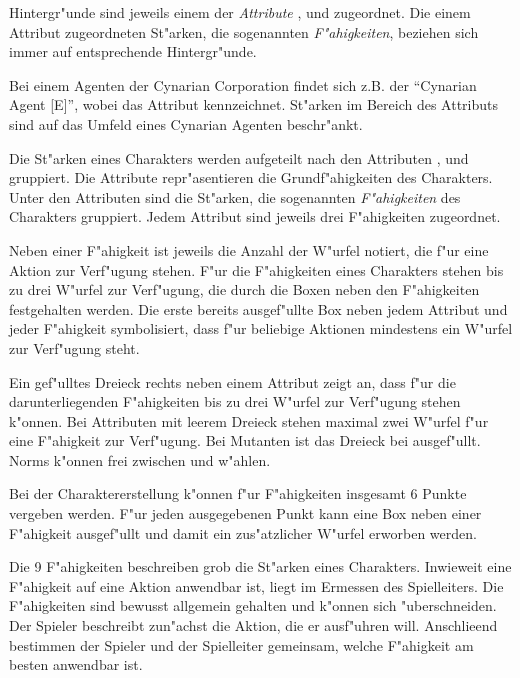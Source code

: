 \medskip
Hintergr"unde sind jeweils einem der \emph{Attribute} ,  und  zugeordnet. Die einem Attribut zugeordneten St"arken, die sogenannten \emph{F"ahigkeiten}, beziehen sich immer auf entsprechende Hintergr"unde.


\medskip
\begin{ruleexample}
    Bei einem Agenten der Cynarian Corporation findet sich z.B. der  "`Cynarian Agent [E]"', wobei \stat{[E]} das Attribut  kennzeichnet. St"arken im Bereich des Attributs sind auf das Umfeld eines Cynarian Agenten beschr"ankt.
\end{ruleexample}

Die St"arken eines Charakters werden aufgeteilt nach den Attributen ,  und  gruppiert. Die Attribute repr"asentieren die Grundf"ahigkeiten des Charakters. Unter den Attributen sind die St"arken, die sogenannten \emph{F"ahigkeiten} des Charakters gruppiert. Jedem Attribut sind jeweils drei F"ahigkeiten zugeordnet. 

Neben einer F"ahigkeit ist jeweils die Anzahl der W"urfel notiert, die f"ur eine Aktion zur Verf"ugung stehen. F"ur die F"ahigkeiten eines Charakters stehen bis zu drei W"urfel zur Verf"ugung, die durch die Boxen neben den F"ahigkeiten  festgehalten werden. Die erste bereits ausgef"ullte Box neben jedem Attribut und jeder F"ahigkeit symbolisiert, dass f"ur beliebige Aktionen mindestens ein W"urfel zur Verf"ugung steht.

Ein gef"ulltes Dreieck rechts neben einem Attribut zeigt an, dass f"ur die darunterliegenden F"ahigkeiten bis zu drei W"urfel zur Verf"ugung stehen k"onnen. Bei Attributen mit leerem Dreieck stehen maximal zwei W"urfel f"ur eine F"ahigkeit zur Verf"ugung. Bei Mutanten ist das Dreieck bei  ausgef"ullt. Norms k"onnen frei zwischen  und  w"ahlen.

Bei der Charaktererstellung k"onnen f"ur F"ahigkeiten insgesamt 6 Punkte vergeben werden. F"ur jeden ausgegebenen Punkt kann eine Box neben einer F"ahigkeit ausgef"ullt und damit ein zus"atzlicher W"urfel erworben werden.

Die 9 F"ahigkeiten beschreiben grob die St"arken eines Charakters. Inwieweit eine F"ahigkeit auf eine Aktion anwendbar ist, liegt im Ermessen des Spielleiters. Die F"ahigkeiten sind bewusst allgemein gehalten und k"onnen sich "uberschneiden. Der Spieler beschreibt zun"achst die Aktion, die er ausf"uhren will. Anschlie\3end bestimmen der Spieler und der Spielleiter gemeinsam, welche F"ahigkeit am besten anwendbar ist.

